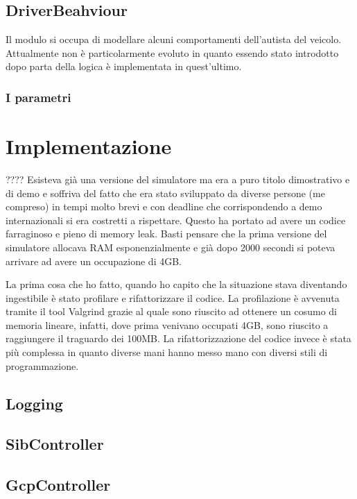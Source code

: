 \subsection{DriverBeahviour}

Il modulo  si occupa di modellare alcuni comportamenti dell'autista del veicolo. Attualmente non è particolarmente evoluto in quanto essendo stato introdotto dopo  parta della logica è implementata in quest'ultimo.

\subsubsection{I parametri}



\section{Implementazione}

????
Esisteva già una versione del simulatore ma era a puro titolo dimostrativo e di demo e soffriva del fatto che era stato sviluppato da diverse persone (me compreso) in tempi molto brevi e con deadline che corrispondendo a demo internazionali si era costretti a rispettare. Questo ha portato ad avere un codice farraginoso e pieno di memory leak. Basti pensare che la prima versione del simulatore allocava RAM esponenzialmente e già dopo 2000 secondi si poteva arrivare ad avere un occupazione di 4GB.

La prima cosa che ho fatto, quando ho capito che la situazione stava diventando ingestibile è stato profilare e rifattorizzare il codice. La profilazione è avvenuta tramite il tool Valgrind grazie al quale sono riuscito ad ottenere un cosumo di memoria lineare, infatti, dove prima venivano occupati 4GB, sono riuscito a raggiungere il traguardo dei 100MB. La rifattorizzazione del codice invece è stata più complessa in quanto diverse mani hanno messo mano con diversi stili di programmazione. 

\subsection{Logging}

\subsection{SibController}

\subsection{GcpController}

